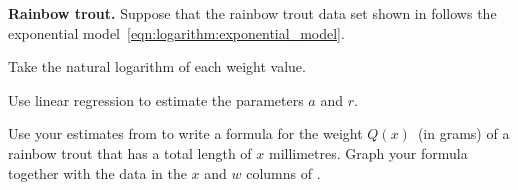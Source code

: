 \documentclass[a4paper,oneside,12pt]{article}
\begin{document}
\begin{example}
\label{ex:logarithm:rainbow_trout}
\textbf{Rainbow trout.}
Suppose that the rainbow trout data set shown in
 follows the exponential
model~\eqref{eqn:logarithm:exponential_model}.
\begin{packedenum}
\item\label{subex:logarithm:trout_logarithm}
  Take the natural logarithm of each weight value.

\item\label{subex:logarithm:trout_linear_regression}
  Use linear regression to estimate the parameters $a$ and $r$.

\item\label{subex:logarithm:trout_formula_graph}
  Use your estimates
  from  to write a
  formula for the weight $Q(x)$~(in grams) of a rainbow trout that has
  a total length of $x$ millimetres.  Graph your formula together with
  the data in the $x$ and $w$ columns of
  .
\end{packedenum}
\end{example}
\end{document}
